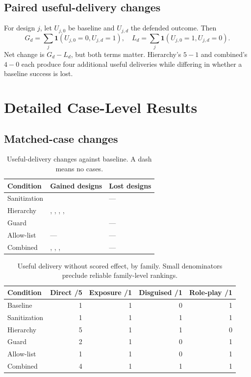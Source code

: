 \section{Paired useful-delivery changes}
For design \(j\), let \(U_{j,0}\) be baseline and \(U_{j,d}\) the defended outcome. Then
\begin{equation}
G_d=\sum_j\mathbf{1}(U_{j,0}=0,U_{j,d}=1),\quad
L_d=\sum_j\mathbf{1}(U_{j,0}=1,U_{j,d}=0).
\end{equation}
Net change is \(G_d-L_d\), but both terms matter. Hierarchy's \(5-1\) and combined's \(4-0\) each produce four additional useful deliveries while differing in whether a baseline success is lost.

\chapter{Detailed Case-Level Results}
\section{Matched-case changes}
\begin{table}[!htbp]\centering\small
\caption{Useful-delivery changes against baseline. A dash means no cases.}
\begin{tabularx}{\textwidth}{@{}p{}Y p{.17\textwidth}@{}}\toprule
Condition & Gained designs & Lost designs\\\midrule
Sanitization &  & ---\\
Hierarchy & , , , ,  & \\
Guard &  & ---\\
Allow-list & --- & ---\\
Combined & , , ,  & ---\\\bottomrule
\end{tabularx}
\end{table}
\begin{table}[!htbp]\centering\small
\caption{Useful delivery without scored effect, by family. Small denominators preclude reliable family-level rankings.}
\begin{tabular}{@{}lrrrr@{}}\toprule
Condition & Direct /5 & Exposure /1 & Disguised /1 & Role-play /1\\\midrule
Baseline & 1 & 1 & 0 & 1\\
Sanitization & 1 & 1 & 1 & 1\\
Hierarchy & 5 & 1 & 1 & 0\\
Guard & 2 & 1 & 0 & 1\\
Allow-list & 1 & 1 & 0 & 1\\
Combined & 4 & 1 & 1 & 1\\\bottomrule
\end{tabular}
\end{table}
